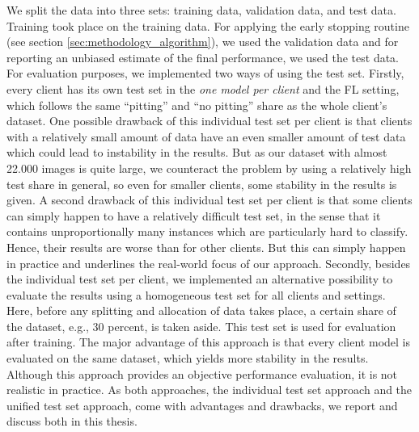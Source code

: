 We split the data into three sets: training data, validation data, and test data. Training took place on the training data. For applying the early stopping routine (see section \ref{sec:methodology_algorithm}), we used the validation data and for reporting an unbiased estimate of the final performance, we used the test data. For evaluation purposes, we implemented two ways of using the test set. Firstly, every client has its own test set in the \emph{one model per client} and the FL setting, which follows the same ``pitting'' and ``no pitting'' share as the whole client's dataset. One possible drawback of this individual test set per client is that clients with a relatively small amount of data have an even smaller amount of test data which could lead to instability in the results. But as our dataset with almost 22.000 images \citep{schlagenhauf2021industrial} is quite large, we counteract the problem by using a relatively high test share in general, so even for smaller clients, some stability in the results is given. A second drawback of this individual test set per client is that some clients can simply happen to have a relatively difficult test set, in the sense that it contains unproportionally many instances which are particularly hard to classify. Hence, their results are worse than for other clients. But this can simply happen in practice and underlines the real-world focus of our approach. Secondly, besides the individual test set per client, we implemented an alternative possibility to evaluate the results using a homogeneous test set for all clients and settings. Here, before any splitting and allocation of data takes place, a certain share of the dataset, e.g., 30 percent, is taken aside. This test set is used for evaluation after training. The major advantage of this approach is that every client model is evaluated on the same dataset, which yields more stability in the results. Although this approach provides an objective performance evaluation, it is not realistic in practice.
As both approaches, the individual test set approach and the unified test set approach, come with advantages and drawbacks, we report and discuss both in this thesis.

